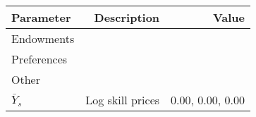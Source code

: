 \begin{tabular}{lrr}
\hline
Parameter & Description  & Value  \\ 
\hline
Endowments &   &   \\ 
Preferences &   &   \\ 
Other &   &   \\ 
$\bar{Y}_{s}$ & Log skill prices  & 0.00, 0.00, 0.00  \\ 
\hline
\end{tabular}%
